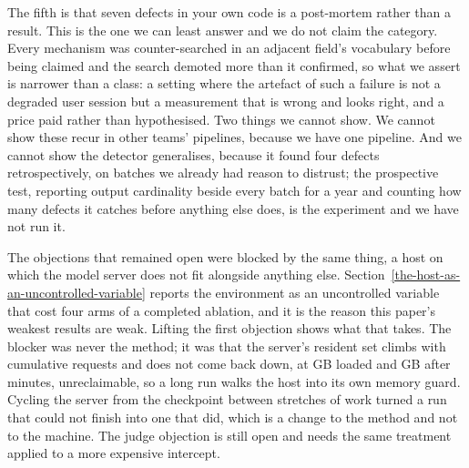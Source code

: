 The fifth is that seven defects in your own code is a post-mortem rather than a result. This is the
one we can least answer and we do not claim the category. Every mechanism was counter-searched in an
adjacent field's vocabulary before being claimed and the search demoted more than it confirmed, so
what we assert is narrower than a class: a setting where the artefact of such a failure is not a
degraded user session but a measurement that is wrong and looks right, and a price paid rather than
hypothesised. Two things we cannot show. We cannot show these recur in other teams' pipelines,
because we have one pipeline. And we cannot show the detector generalises, because it found four
defects retrospectively, on batches we already had reason to distrust; the prospective test,
reporting output cardinality beside every batch for a year and counting how many defects it catches
before anything else does, is the experiment and we have not run it.

The objections that remained open were blocked by the same thing, a host on which the model server
does not fit alongside anything else. Section~\ref{the-host-as-an-uncontrolled-variable} reports the
environment as an uncontrolled variable that cost four arms of a completed ablation, and it is the
reason this paper's weakest results are weak. Lifting the first objection shows what that takes. The
blocker was never the method; it was that the server's resident set climbs with cumulative requests
and does not come back down, at  GB loaded and
 GB after  minutes, unreclaimable, so
a long run walks the host into its own memory guard. Cycling the server from the checkpoint between
stretches of work turned a run that could not finish into one that did, which is a change to the
method and not to the machine. The judge objection is still open and needs the same treatment
applied to a more expensive intercept.
